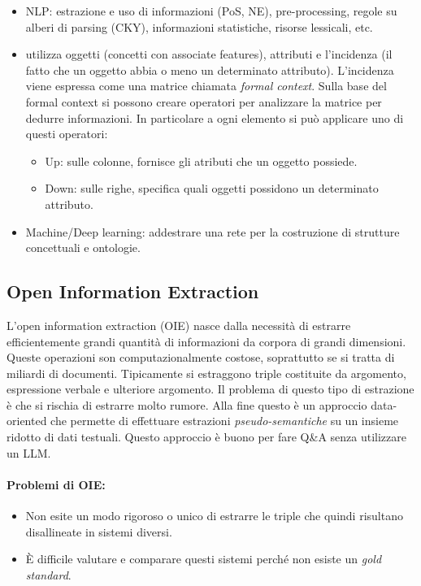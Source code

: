 \begin{itemize}
  \item NLP: estrazione e uso di informazioni (PoS, NE), pre-processing, regole su alberi di parsing (CKY), informazioni statistiche, risorse lessicali, etc. 
  \item {} utilizza oggetti (concetti con associate features), attributi e l'incidenza (il fatto che un oggetto abbia o meno un determinato attributo). L'incidenza viene espressa come una matrice chiamata \textit{formal context}. Sulla base del formal context si possono creare operatori per analizzare la matrice per dedurre informazioni. In particolare a ogni elemento si può applicare uno di questi operatori:
    \begin{itemize}
      \item Up: sulle colonne, fornisce gli atributi che un oggetto possiede. 
      \item Down: sulle righe, specifica quali oggetti possidono un determinato attributo.
    \end{itemize}
  \item Machine/Deep learning: addestrare una rete per la costruzione di strutture concettuali e ontologie.
\end{itemize}

\subsection{Open Information Extraction}

L'open information extraction (OIE) nasce dalla necessità di estrarre efficientemente grandi quantità di informazioni da corpora di grandi dimensioni. Queste operazioni son computazionalmente costose, soprattutto se si tratta di miliardi di documenti. Tipicamente si estraggono triple costituite da argomento, espressione verbale e ulteriore argomento. Il problema di questo tipo di estrazione è che si rischia di estrarre molto rumore. Alla fine questo è un approccio data-oriented che permette di effettuare estrazioni \textit{pseudo-semantiche} su un insieme ridotto di dati testuali. Questo approccio è buono per fare Q\&A senza utilizzare un LLM.

\paragraph{Problemi di OIE:}

\begin{itemize}
  \item Non esite un modo rigoroso o unico di estrarre le triple che quindi risultano disallineate in sistemi diversi. 
  \item È difficile valutare e comparare questi sistemi perché non esiste un \textit{gold standard}. 
\end{itemize}

